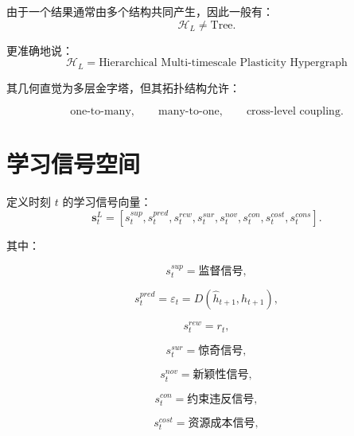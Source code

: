 由于一个结果通常由多个结构共同产生，因此一般有：
\begin{equation}
\mathcal{H}_L
\neq
\text{Tree}.
\end{equation}

更准确地说：
\begin{equation}
\boxed{
\mathcal{H}_L
=
\text{Hierarchical Multi-timescale Plasticity Hypergraph}
}
\end{equation}

其几何直觉为多层金字塔，但其拓扑结构允许：

\begin{equation}
\text{one-to-many},
\qquad
\text{many-to-one},
\qquad
\text{cross-level coupling}.
\end{equation}


\section{学习信号空间}

定义时刻 $t$ 的学习信号向量：
\begin{equation}
\mathbf{s}_t^L
=
\left[
s_t^{sup},
s_t^{pred},
s_t^{rew},
s_t^{sur},
s_t^{nov},
s_t^{con},
s_t^{cost},
s_t^{cons}
\right].
\end{equation}

其中：

\begin{equation}
s_t^{sup}
=
\text{监督信号},
\end{equation}

\begin{equation}
s_t^{pred}
=
\varepsilon_t
=
D(\hat h_{t+1},h_{t+1}),
\end{equation}

\begin{equation}
s_t^{rew}
=
r_t,
\end{equation}

\begin{equation}
s_t^{sur}
=
\text{惊奇信号},
\end{equation}

\begin{equation}
s_t^{nov}
=
\text{新颖性信号},
\end{equation}

\begin{equation}
s_t^{con}
=
\text{约束违反信号},
\end{equation}

\begin{equation}
s_t^{cost}
=
\text{资源成本信号},
\end{equation}

